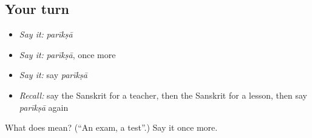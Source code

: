 \subsection*{Your turn}
\begin{itemize}
\raggedright
  \item \emph{Say it:} \emph{parīkṣā}
  \item \emph{Say it:} \emph{parīkṣā}, once more
  \item \emph{Say it:} say \emph{parīkṣā}
  \item \emph{Recall:} say the Sanskrit for a teacher, then the Sanskrit for a lesson, then say \emph{parīkṣā} again
\end{itemize}

\begin{tcolorbox}[breakable,colback=teal!4,colframe=teal!35!black,title={Before you move on}]
What does  mean? (\textquotedblleft{}An exam, a test\textquotedblright{}.) Say it once more.
\end{tcolorbox}
